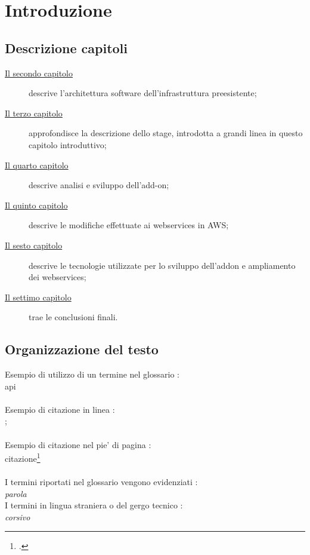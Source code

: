 
\chapter{Introduzione}
\label{cap:introduzione}

\section{Descrizione capitoli}
\begin{description}
	\item[{\hyperref[cap:descrizione-architettura]{Il secondo capitolo}}] descrive l'architettura software dell'infrastruttura preesistente;
	
	\item[{\hyperref[cap:descrizione-stage]{Il terzo capitolo}}] approfondisce la descrizione dello stage, introdotta a grandi linea in questo capitolo introduttivo;
	
	\item[{\hyperref[cap:sviluppo-addon]{Il quarto capitolo}}] descrive analisi e sviluppo dell'add-on;
	
	\item[{\hyperref[cap:webservices]{Il quinto capitolo}}] descrive le modifiche effettuate ai webservices in AWS;
	
	\item[{\hyperref[cap:tecnologie-coinvolte]{Il sesto capitolo}}] descrive le tecnologie utilizzate per lo sviluppo dell'addon e ampliamento dei webservices;
	
	\item[{\hyperref[cap:conclusioni]{Il settimo capitolo}}] trae le conclusioni finali.
\end{description}
\section{Organizzazione del testo}

\noindent Esempio di utilizzo di un termine nel glossario :\\\gls{api}\\ \\
\noindent Esempio di citazione in linea :\\\cite{site:agile-manifesto};\\\\
\noindent Esempio di citazione nel pie' di pagina :\\citazione\footcite{womak:lean-thinking} \\\\
\noindent I termini riportati nel glossario vengono evidenziati :\\\emph{parola}\glsfirstoccur\\ \noindent I termini in lingua straniera o del gergo tecnico :\\ \emph{corsivo}\\


